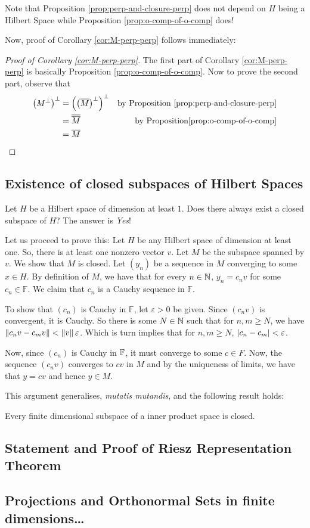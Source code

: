 Note that Proposition \ref{prop:perp-and-closure-perp} does not depend on $H$ being a Hilbert Space while Proposition \ref{prop:o-comp-of-o-comp} does!

Now, proof of Corollary \ref{cor:M-perp-perp} follows immediately:
\begin{proof}[Proof of Corollary \ref{cor:M-perp-perp}]
    The first part of Corollary \ref{cor:M-perp-perp} is basically Proposition \ref{prop:o-comp-of-o-comp}. Now to prove the second part, observe that
    \begin{align*}
    \left( M^{\perp} \right) ^{\perp} &= \left( \left( \overline M \right) ^{\perp} \right) ^{\perp} & \text{by Proposition } \ref{prop:perp-and-closure-perp} \\
    &= \overline{\overline{M}} & \text{by Proposition} \ref{prop:o-comp-of-o-comp} \\
    &= \overline M
    \end{align*}
\end{proof}

\subsection{Existence of closed subspaces of Hilbert Spaces}
Let $H$ be a Hilbert space of dimension at least $1$. Does there always exist a closed subspace of $H$? The answer is \textit{Yes}!

Let us proceed to prove this: Let $H$ be any Hilbert space of dimension at least one. So, there is at least one nonzero vector $v$. Let $M$ be the subspace spanned by $v$. We show that $M$ is closed. Let $\left( y_{n} \right)$ be a sequence in $M$ converging to some $x \in H$.
By definition of $M$, we have that for every $n\in \mathbb N$, $y_{n} = c_{n}v$ for some $c_n \in \mathbb F$. We claim that $c_{n}$ is a Cauchy sequence in $\mathbb F$.

To show that $\left( c_{n} \right)$ is Cauchy in $\mathbb F$, let $\varepsilon > 0$ be given. Since $\left( c_{n} v \right)$ is convergent, it is Cauchy. So there is some $N \in \mathbb N$ such that for $n,m \ge N$, we have $\left\lVert c_n v - c_{m} v \right\rVert < \left\lVert v \right\rVert \varepsilon$. Which is turn implies that for $n,m \ge N$, $\left\lvert c_{n} - c_{m} \right\rvert < \varepsilon$.

Now, since $\left( c_{n} \right)$ is Cauchy in $\mathbb F$, it must converge to some $c\in F$. Now, the sequence $\left( c_{n} v \right)$ converges to $cv$ in $M$ and by the uniqueness of limits, we have that $y=cv$ and hence $y\in M$.

This argument generalises, \textit{mutatis mutandis}, and the following result holds:
\begin{theorem}
    Every finite dimensional subspace of a inner product space is closed.
    \label{thm:fds-are-closed}
\end{theorem}
\subsection{Statement and Proof of Riesz Representation Theorem}

\subsection{Projections and Orthonormal Sets in finite dimensions\ldots}
